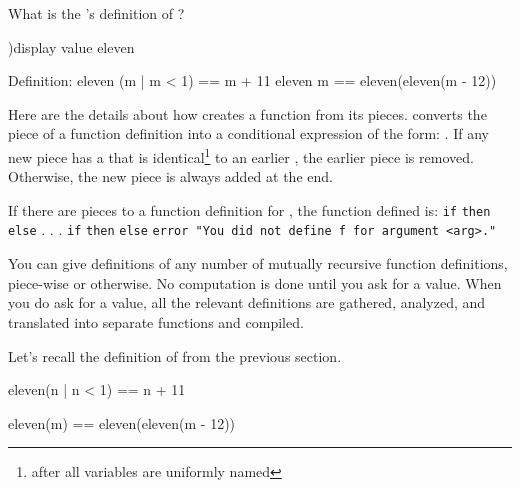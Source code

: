 \begin{xtc}
\begin{xtccomment}
What is the \Language{}'s definition of ?
\end{xtccomment}
\begin{spadsrc}
)display value eleven
\end{spadsrc}
\begin{SysCmdOutput}
   Definition:
     eleven (m | m < 1) == m + 11
     eleven m == eleven(eleven(m - 12))
\end{SysCmdOutput}
\end{xtc}

Here are the details about how \Language{} creates a function from its
pieces.
\Language{} converts the  piece of a function definition into a
conditional expression of the form:   
.
If any new piece has a  that is identical\footnote{after all
variables are uniformly named} to an earlier , the earlier piece is
removed.
Otherwise, the new piece is always added at the end.

\beginImportant
If there are  pieces to a function definition for ,
the function defined  is: \newline
%
\hspace*{3pc}
{\tt if}  {\tt then}  {\tt else}\newline
\hspace*{6pc}. . . \newline
\hspace*{3pc}
{\tt if}  {\tt then}  {\tt else}\newline
\hspace*{3pc}
{\tt  error "You did not define f for argument <arg>."}
%
\endImportant

You can give definitions of any number of mutually recursive function
definitions, piece-wise or otherwise.
No computation is done until you ask for a value.
When you do ask for a value, all the relevant definitions are gathered,
analyzed, and translated into separate functions and compiled.

\begin{xtc}
\begin{xtccomment}
Let's recall the definition of  from
the previous section.
\end{xtccomment}
\begin{spadsrc}
eleven(n | n < 1) == n + 11
\end{spadsrc}
\end{xtc}
\begin{xtc}
\begin{xtccomment}
\end{xtccomment}
\begin{spadsrc}
eleven(m) == eleven(eleven(m - 12))
\end{spadsrc}
\end{xtc}

